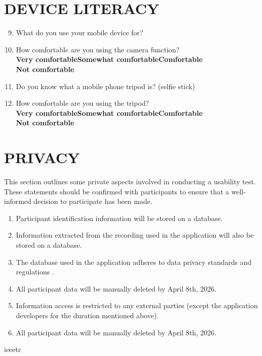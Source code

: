 \documentclass{article}
\begin{document}
\section{\textbf{DEVICE LITERACY}}
\begin{enumerate}
    \setcounter{enumi}{8}
    \item What do you use your mobile device for?
    \item How comfortable are you using the camera function? 
    \\\textbf{Very comfortable\qquad Somewhat comfortable\qquad Comfortable\qquad \\Not comfortable}
    \item Do you know what a mobile phone tripod is? (selfie stick)
    \item How comfortable are you using the tripod?
    \\\textbf{Very comfortable\qquad Somewhat comfortable\qquad Comfortable\qquad \\Not comfortable} 
\end{enumerate}
\section{\textbf{PRIVACY}}
This section outlines some private aspects involved in conducting a usability test. These statements 
should be confirmed with participants to ensure that a well-informed decision to participate has been made. 
\begin{enumerate}
    \item Participant identification information will be stored on a database. 
    \item Information extracted from the recording used in the application will also be stored on a database.
    \item The database used in the application adheres to data privacy standards and regulations \cite{firebase_privacy}.
    \item All participant data will be manually deleted by April 8th, 2026. 
    \item Information access is restricted to any external parties (except the application developers for the duration mentioned above).
    \item All participant data will be manually deleted by April 8th, 2026. 
\end{enumerate}

 {ieeetr}

\end{document}
